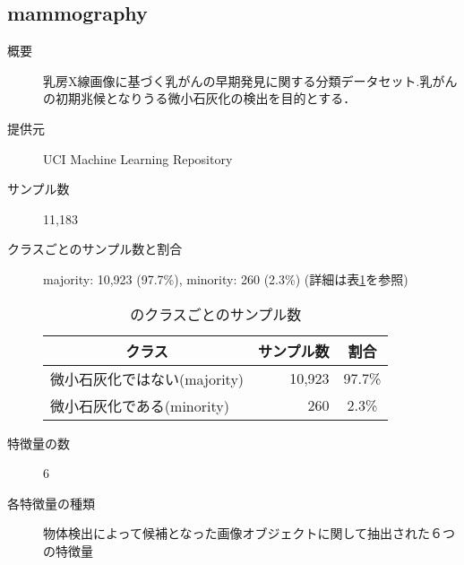 \subsection{mammography}
\begin{description}
    \item[概要] 乳房X線画像に基づく乳がんの早期発見に関する分類データセット.乳がんの初期兆候となりうる微小石灰化の検出を目的とする．\cite{mammography}
    \item[提供元] UCI Machine Learning Repository
    \item[サンプル数] 11,183
    \item[クラスごとのサンプル数と割合] majority: 10,923 (97.7\%), minority: 260 (2.3\%) (詳細は表\ref{tab:mammography}を参照)
        \begin{table}[htbp]
            \centering
            \caption{のクラスごとのサンプル数}
            \label{tab:mammography}
            \begin{tabular}{lrc} \hline
                \multicolumn{1}{c}{クラス}&
                \multicolumn{1}{c}{サンプル数}&
                \multicolumn{1}{c}{割合}\\
                \hline
                \hline
                微小石灰化ではない(majority) & 10,923 & 97.7\% \\
                微小石灰化である(minority) & 260 & 2.3\% \\
                \hline
            \end{tabular}
        \end{table}

    \item[特徴量の数] 6
    \item[各特徴量の種類] 物体検出によって候補となった画像オブジェクトに関して抽出された６つの特徴量
\end{description}


